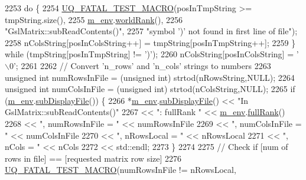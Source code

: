 \begin{DoxyCode}
2253     \textcolor{keywordflow}{do} \{
2254       \hyperlink{_defines_8h_a56d63d18d0a6d45757de47fcc06f574d}{UQ\_FATAL\_TEST\_MACRO}(posInTmpString >= tmpString.size(),
2255                           \hyperlink{class_q_u_e_s_o_1_1_matrix_a247fb0fc0b87fecdee054bb4660b68e8}{m\_env}.\hyperlink{class_q_u_e_s_o_1_1_base_environment_a78b57112bbd0e6dd0e8afec00b40ffa7}{worldRank}(),
2256                           \textcolor{stringliteral}{"GslMatrix::subReadContents()"},
2257                           \textcolor{stringliteral}{"symbol ')' not found in first line of file"});
2258       nColsString[posInColsString++] = tmpString[posInTmpString++];
2259     \} \textcolor{keywordflow}{while} (tmpString[posInTmpString] != \textcolor{charliteral}{')'});
2260     nColsString[posInColsString] = \textcolor{charliteral}{'\(\backslash\)0'};
2261 
2262     \textcolor{comment}{// Convert 'n\_rows' and 'n\_cols' strings to numbers}
2263     \textcolor{keywordtype}{unsigned} \textcolor{keywordtype}{int} numRowsInFile = (\textcolor{keywordtype}{unsigned} int) strtod(nRowsString,NULL);
2264     \textcolor{keywordtype}{unsigned} \textcolor{keywordtype}{int} numColsInFile = (\textcolor{keywordtype}{unsigned} int) strtod(nColsString,NULL);
2265     \textcolor{keywordflow}{if} (\hyperlink{class_q_u_e_s_o_1_1_matrix_a247fb0fc0b87fecdee054bb4660b68e8}{m\_env}.\hyperlink{class_q_u_e_s_o_1_1_base_environment_a8a0064746ae8dddfece4229b9ad374d6}{subDisplayFile}()) \{
2266       *\hyperlink{class_q_u_e_s_o_1_1_matrix_a247fb0fc0b87fecdee054bb4660b68e8}{m\_env}.\hyperlink{class_q_u_e_s_o_1_1_base_environment_a8a0064746ae8dddfece4229b9ad374d6}{subDisplayFile}() << \textcolor{stringliteral}{"In GslMatrix::subReadContents()"}
2267                               << \textcolor{stringliteral}{": fullRank "}        << \hyperlink{class_q_u_e_s_o_1_1_matrix_a247fb0fc0b87fecdee054bb4660b68e8}{m\_env}.\hyperlink{class_q_u_e_s_o_1_1_base_environment_a84a239e42ae443cf71db6e03e8159620}{fullRank}()
2268                               << \textcolor{stringliteral}{", numRowsInFile = "} << numRowsInFile
2269                               << \textcolor{stringliteral}{", numColsInFile = "} << numColsInFile
2270                               << \textcolor{stringliteral}{", nRowsLocal = "}    << nRowsLocal
2271                               << \textcolor{stringliteral}{", nCols = "}         << nCols
2272                               << std::endl;
2273     \}
2274 
2275     \textcolor{comment}{// Check if [num of rows in file] == [requested matrix row size]}
2276     \hyperlink{_defines_8h_a56d63d18d0a6d45757de47fcc06f574d}{UQ\_FATAL\_TEST\_MACRO}(numRowsInFile != nRowsLocal,

\end{DoxyCode}
